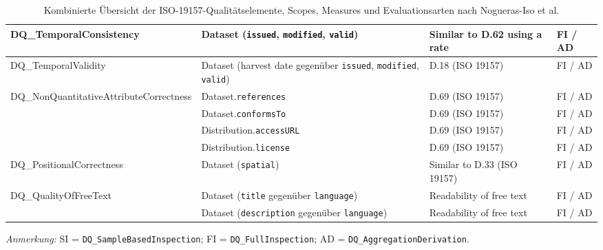 {\begin{table}[h!]
\begin{tabular}{|p{4.2cm}|p{4.9cm}|p{2.0cm}|p{1.3cm}|}
DQ\_TemporalConsistency
& Dataset (\texttt{issued}, \texttt{modified}, \texttt{valid})
& Similar to D.62 using a rate
& FI / AD \\
\hline

DQ\_TemporalValidity
& Dataset (harvest date gegenüber \texttt{issued}, \texttt{modified}, \texttt{valid})
& D.18 (ISO 19157)
& FI / AD \\
\hline

DQ\_NonQuantitativeAttributeCorrectness
& Dataset.\texttt{references}
& D.69 (ISO 19157)
& FI / AD \\ \cline{2-4}
& Dataset.\texttt{conformsTo}
& D.69 (ISO 19157)
& FI / AD \\ \cline{2-4}
& Distribution.\texttt{accessURL}
& D.69 (ISO 19157)
& FI / AD \\ \cline{2-4}
& Distribution.\texttt{license}
& D.69 (ISO 19157)
& FI / AD \\
\hline

DQ\_PositionalCorrectness
& Dataset (\texttt{spatial})
& Similar to D.33 (ISO 19157)
& FI / AD \\
\hline

DQ\_QualityOfFreeText
& Dataset (\texttt{title} gegenüber \texttt{language})
& Readability of free text
& FI / AD \\ \cline{2-4}
& Dataset (\texttt{description} gegenüber \texttt{language})
& Readability of free text
& FI / AD \\
\hline

\end{tabular}
\caption[Kombinierte Übersicht der ISO-19157-Qualitätselemente, Scopes, Measures und Evaluationsarten nach Nogueras-Iso et al. ]{Kombinierte Übersicht der ISO-19157-Qualitätselemente, Scopes, Measures und Evaluationsarten nach Nogueras-Iso et al. \cite{noguerasiso_quality_metadata}}
\label{tab:nogueras_iso_quality_elements}
\end{table}
\normalsize
}

\noindent\footnotesize{\textit{Anmerkung:} SI = \texttt{DQ\_SampleBasedInspection}; FI = \texttt{DQ\_FullInspection}; AD = \texttt{DQ\_AggregationDerivation}.}
\normalsize

